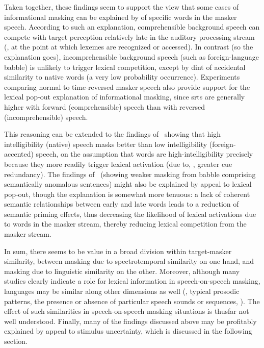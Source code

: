 Taken together, these findings seem to support the view that some cases of informational masking can be explained by  of specific words in the masker speech.  According to such an explanation, comprehensible background speech can compete with target perception relatively late in the auditory processing stream (\ie, at the point at which lexemes are recognized or accessed).  In contrast (so the explanation goes), incomprehensible background speech (such as foreign-language babble) is unlikely to trigger lexical competition, except by dint of accidental similarity to native words (a very low probability occurrence).  Experiments comparing normal to time-reversed masker speech also provide support for the lexical pop-out explanation of informational masking, since \ac{srt}s are generally higher with forward (comprehensible) speech than with reversed (incomprehensible) speech.\footnotemark{}


This reasoning can be extended to the findings of \citeauthor{CalandruccioEtAl2010}\ showing that high intelligibility (native) speech masks better than low intelligibility (foreign-accented) speech, on the assumption that words are high-intelligibility precisely because they more readily trigger lexical activation (due to, \eg, greater cue redundancy).  The findings of \citeauthor{BrouwerEtAl2012}\ (showing weaker masking from babble comprising semantically anomalous sentences) might also be explained by appeal to lexical pop-out, though the explanation is somewhat more tenuous: a lack of coherent semantic relationships between early and late words leads to a reduction of semantic priming effects, thus decreasing the likelihood of lexical activations due to words in the masker stream, thereby reducing lexical competition from the masker stream.  

In sum, there seems to be value in a broad division within target-masker similarity, between masking due to spectrotemporal similarity on one hand, and masking due to linguistic similarity on the other.\footnotemark{}  Moreover, although many studies clearly indicate a role for lexical information in speech-on-speech masking, languages may be similar along other dimensions as well (\eg, typical prosodic patterns, the presence or absence of particular speech sounds or sequences, \etc).  The effect of such similarities in speech-on-speech masking situations is thusfar not well understood.  Finally, many of the findings discussed above may be profitably explained by appeal to stimulus uncertainty, which is discussed in the following section.
  
